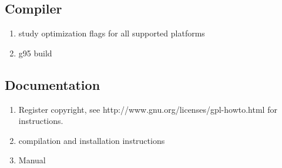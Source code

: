 \documentclass{article}
\begin{document}
\subsection{Compiler}
\begin{enumerate}
\item study optimization flags for all supported platforms
\item g95 build
\end{enumerate}

\subsection{Documentation}
\begin{enumerate}
\item Register copyright, see http://www.gnu.org/licenses/gpl-howto.html
  for instructions.
\item compilation and installation instructions
\item Manual
\end{enumerate}



\end{document}
